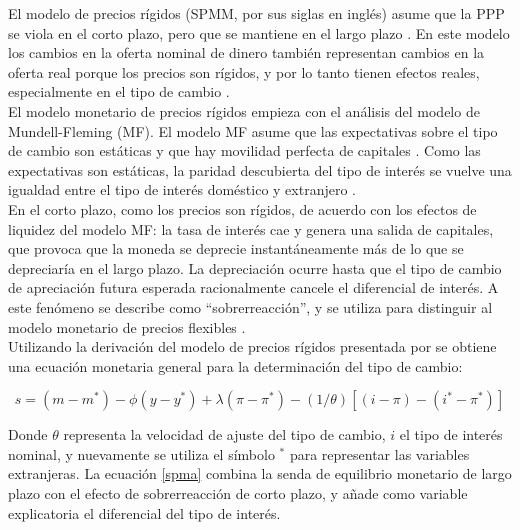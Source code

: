 	El modelo de precios rígidos (SPMM, por sus siglas en inglés) asume que la PPP se viola en el corto plazo, pero que se mantiene en el largo plazo \parencite{exchecon}. En este modelo los cambios en la oferta nominal de dinero también representan cambios en la oferta real porque los precios son rígidos, y por lo tanto tienen efectos reales, especialmente en el tipo de cambio \parencite{frankel1993exchange}.\\
	
	El modelo monetario de precios rígidos empieza con el análisis del modelo de Mundell-Fleming (MF). El modelo MF asume que las expectativas sobre el tipo de cambio son estáticas y que hay movilidad perfecta de capitales \parencite{exchecon}. Como las expectativas son estáticas, la paridad descubierta del tipo de interés se vuelve una igualdad entre el tipo de interés doméstico y extranjero \parencite{frankel1993exchange}.\\
	
	En el corto plazo, como los precios son rígidos, de acuerdo con los efectos de liquidez del modelo MF: la tasa de interés cae y genera una salida de capitales, que provoca que la moneda se deprecie instantáneamente más de lo que se depreciaría en el largo plazo. La depreciación ocurre hasta que el tipo de cambio de apreciación futura esperada racionalmente cancele el diferencial de interés. A este fenómeno se describe como ``sobrerreacción'', y se utiliza para distinguir al modelo monetario de precios flexibles \parencite{frankel1993exchange}.\\
	
	Utilizando la derivación del modelo de precios rígidos presentada por \textcite[89]{frankel1993exchange} se obtiene una ecuación monetaria general para la determinación del tipo de cambio: 
	
	\begin{equation}
		s = (m - m^*) - \phi (y-y^*) + \lambda (\pi - \pi^*) - (1/\theta)[(i-\pi) - (i^* - \pi^*)]
		\label{spma}
	\end{equation}
	
	Donde $\theta$ representa la velocidad de ajuste del tipo de cambio, $i$ el tipo de interés nominal, y nuevamente se utiliza el símbolo $^*$ para representar las variables extranjeras. La ecuación \ref{spma} combina la senda de equilibrio monetario de largo plazo con el efecto de sobrerreacción de corto plazo, y añade como variable explicatoria el diferencial del tipo de interés.
	
